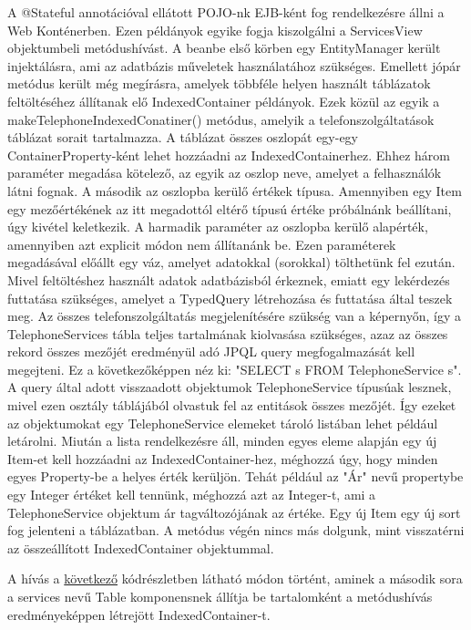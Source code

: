 \documentclass[centeredchapter]{thesis-ekf}
\theoremstyle{definition}
\theoremstyle{remark}
\begin{document}
A @Stateful annotációval ellátott POJO-nk EJB-ként fog rendelkezésre állni a Web Konténerben. Ezen példányok egyike fogja kiszolgálni a ServicesView objektumbeli metódushívást. A beanbe első körben egy EntityManager került injektálásra, ami az adatbázis műveletek használatához szükséges. Emellett jópár metódus került még megírásra, amelyek többféle helyen használt táblázatok feltöltéséhez állítanak elő IndexedContainer példányok. Ezek közül az egyik a makeTelephoneIndexedConatiner() metódus, amelyik a telefonszolgáltatások táblázat sorait tartalmazza. A táblázat összes oszlopát egy-egy ContainerProperty-ként lehet hozzáadni az IndexedContainerhez. Ehhez három paraméter megadása kötelező, az egyik az oszlop neve, amelyet a felhasználók látni fognak. A második az oszlopba kerülő értékek típusa. Amennyiben egy Item egy mezőértékének az itt megadottól eltérő típusú értéke próbálnánk beállítani, úgy kivétel keletkezik. A harmadik paraméter az oszlopba kerülő alapérték, amennyiben azt explicit módon nem állítanánk be. Ezen paraméterek megadásával előállt egy váz, amelyet adatokkal (sorokkal) tölthetünk fel ezután.
Mivel feltöltéshez használt adatok adatbázisból érkeznek, emiatt egy lekérdezés futtatása szükséges, amelyet a TypedQuery létrehozása és futtatása által teszek meg. Az összes telefonszolgáltatás megjelenítésére szükség van a képernyőn, így a TelephoneServices tábla teljes tartalmának kiolvasása szükséges, azaz az összes rekord összes mezőjét eredményül adó JPQL query megfogalmazását kell megejteni. Ez a következőképpen néz ki: "SELECT s FROM TelephoneService s". A query által adott visszaadott objektumok TelephoneService típusúak lesznek, mivel ezen osztály táblájából olvastuk fel az entitások összes mezőjét. Így ezeket az objektumokat egy TelephoneService elemeket tároló listában lehet például letárolni. Miután a lista rendelkezésre áll, minden egyes eleme alapján egy új Item-et kell hozzáadni az IndexedContainer-hez, méghozzá úgy, hogy minden egyes Property-be a helyes érték kerüljön. Tehát például az "Ár" nevű propertybe egy Integer értéket kell tennünk, méghozzá azt az Integer-t, ami a TelephoneService objektum ár tagváltozójának az értéke. Egy új Item egy új sort fog jelenteni a táblázatban.
A metódus végén nincs más dolgunk, mint visszatérni az összeállított IndexedContainer objektummal.

A hívás a \hyperlink{figure-datasource}{következő} kódrészletben látható módon történt, aminek a második sora a services nevű Table komponensnek állítja be tartalomként a metódushívás eredményeképpen létrejött IndexedContainer-t.
\end{document}
